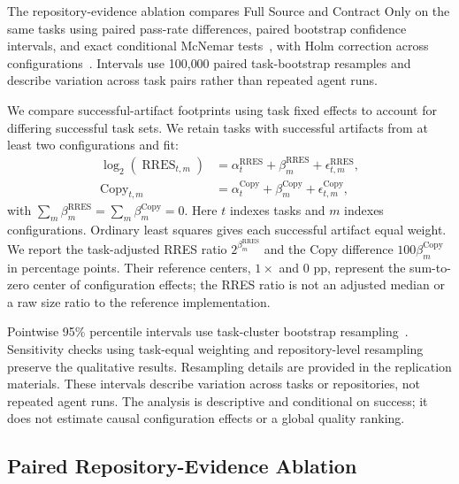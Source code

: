 \documentclass[acmsmall,screen,review,anonymous]{acmart}
\begin{document}
The repository-evidence ablation compares Full Source and Contract Only on the same
tasks using paired pass-rate differences, paired bootstrap confidence intervals,
and exact conditional McNemar tests~\cite{fagerland2013mcnemar}, with Holm
correction across configurations~\cite{holm1979multiple}. Intervals use
100{,}000 paired task-bootstrap resamples and describe variation across task
pairs rather than repeated agent runs.

We compare successful-artifact footprints using task fixed effects to account
for differing successful task sets. We retain tasks with successful artifacts
from at least two configurations and fit:
\begin{equation}
\begin{aligned}
  \log_2\!\left(\operatorname{RRES}_{t,m}\right)
    &= \alpha_t^{\mathrm{RRES}} + \beta_m^{\mathrm{RRES}}
       + \epsilon_{t,m}^{\mathrm{RRES}}, \\
  \operatorname{Copy}_{t,m}
    &= \alpha_t^{\mathrm{Copy}} + \beta_m^{\mathrm{Copy}}
       + \epsilon_{t,m}^{\mathrm{Copy}},
\end{aligned}
\label{eq:adjusted-footprint}
\end{equation}
with $\sum_m\beta_m^{\mathrm{RRES}}=\sum_m\beta_m^{\mathrm{Copy}}=0$.
Here $t$ indexes tasks and $m$ indexes configurations. Ordinary least squares
gives each successful artifact equal weight. We report the task-adjusted RRES
ratio $2^{\beta_m^{\mathrm{RRES}}}$ and the Copy difference
$100\beta_m^{\mathrm{Copy}}$ in percentage points. Their reference centers,
$1\times$ and 0 pp, represent the sum-to-zero center of configuration effects;
the RRES ratio is not an adjusted median or a raw size ratio to the reference
implementation.

Pointwise 95\% percentile intervals use task-cluster bootstrap
resampling~\cite{field2007cluster}. Sensitivity checks using task-equal weighting
and repository-level resampling preserve the qualitative results. Resampling
details are provided in the replication materials. These intervals describe
variation across tasks or repositories, not repeated agent runs. The analysis
is descriptive and conditional on success; it does not estimate causal
configuration effects or a global quality ranking.

\subsection{Paired Repository-Evidence Ablation}
\label{sec:source-ablation-protocol}
\end{document}
